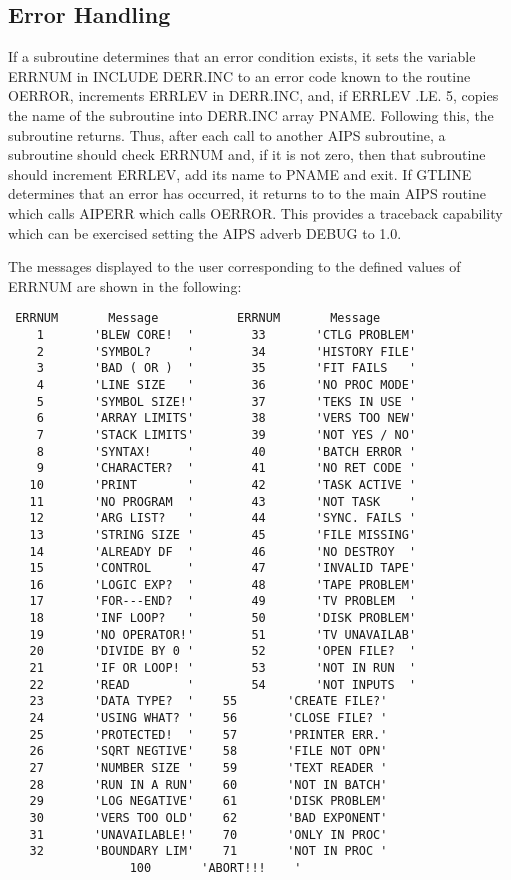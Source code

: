 \subsection{Error Handling}
If a subroutine determines that an error condition exists, it sets the
variable ERRNUM in INCLUDE DERR.INC to an error code known to the
routine OERROR, increments ERRLEV in DERR.INC, and, if ERRLEV .LE. 5,
copies the name of the subroutine into
DERR.INC array PNAME.  Following this, the subroutine returns.  Thus,
after each call to another AIPS subroutine, a subroutine should check
ERRNUM and, if it is not zero, then that subroutine should increment
ERRLEV, add its name to PNAME and exit.  If GTLINE determines that an
error has occurred, it returns to to the main AIPS routine which calls
AIPERR which calls OERROR. This provides a traceback capability which
can be exercised setting the AIPS adverb DEBUG to 1.0.

   The messages displayed to the user corresponding to the defined
values of ERRNUM are shown in the following:
\begin{verbatim}
 ERRNUM       Message           ERRNUM       Message
    1       'BLEW CORE!  '        33       'CTLG PROBLEM'
    2       'SYMBOL?     '        34       'HISTORY FILE'
    3       'BAD ( OR )  '        35       'FIT FAILS   '
    4       'LINE SIZE   '        36       'NO PROC MODE'
    5       'SYMBOL SIZE!'        37       'TEKS IN USE '
    6       'ARRAY LIMITS'        38       'VERS TOO NEW'
    7       'STACK LIMITS'        39       'NOT YES / NO'
    8       'SYNTAX!     '        40       'BATCH ERROR '
    9       'CHARACTER?  '        41       'NO RET CODE '
   10       'PRINT       '        42       'TASK ACTIVE '
   11       'NO PROGRAM  '        43       'NOT TASK    '
   12       'ARG LIST?   '        44       'SYNC. FAILS '
   13       'STRING SIZE '        45       'FILE MISSING'
   14       'ALREADY DF  '        46       'NO DESTROY  '
   15       'CONTROL     '        47       'INVALID TAPE'
   16       'LOGIC EXP?  '        48       'TAPE PROBLEM'
   17       'FOR---END?  '        49       'TV PROBLEM  '
   18       'INF LOOP?   '        50       'DISK PROBLEM'
   19       'NO OPERATOR!'        51       'TV UNAVAILAB'
   20       'DIVIDE BY 0 '        52       'OPEN FILE?  '
   21       'IF OR LOOP! '        53       'NOT IN RUN  '
   22       'READ        '        54       'NOT INPUTS  '
   23       'DATA TYPE?  '	  55       'CREATE FILE?'
   24       'USING WHAT? '	  56       'CLOSE FILE? '
   25       'PROTECTED!  '	  57       'PRINTER ERR.'
   26       'SQRT NEGTIVE'	  58       'FILE NOT OPN'
   27       'NUMBER SIZE '	  59       'TEXT READER '
   28       'RUN IN A RUN'	  60       'NOT IN BATCH'
   29       'LOG NEGATIVE'	  61       'DISK PROBLEM'
   30       'VERS TOO OLD'	  62       'BAD EXPONENT'
   31       'UNAVAILABLE!'	  70       'ONLY IN PROC'
   32       'BOUNDARY LIM'	  71       'NOT IN PROC '
				 100       'ABORT!!!    '

\end{verbatim}


